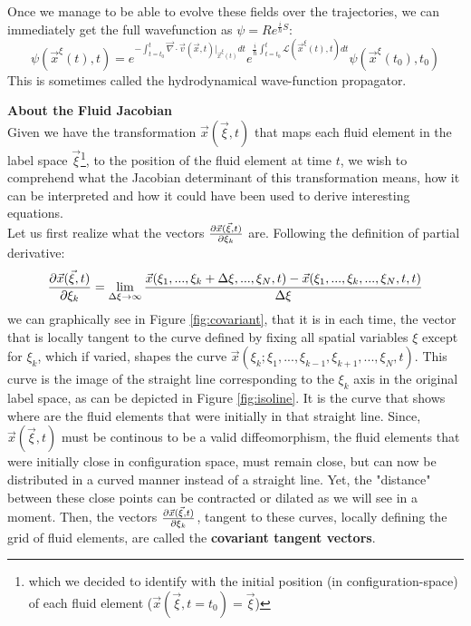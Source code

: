 \documentclass[11pt, a4paper]{article} %
\newcommand{\Lg}{\mathscr{L}}
\DeclareRobustCommand{\mybox}[2][gray!20]{%
\begin{tcolorbox}[   %
        left=1cm,
        right=1cm,
        top=0.5cm,
        bottom=0.5cm,
        colback=#1,
        colframe=#1,
        width=\dimexpr\textwidth\relax, 
        enlarge left by=0mm,
        boxsep=5pt,
        arc=0pt,outer arc=0pt,
        ]
        #2
\end{tcolorbox}
}
\begin{document}
Once we manage to be able to evolve these fields over the trajectories, we can immediately get the full wavefunction as $\psi=Re^{\frac{i}{\hbar}S}$:
\begin{equation}
\psi(\vec{x}^\xi(t),t)=e^{-\int_{t=t_0}^t \vec{\nabla}\cdot \vec{v}(\vec{x},t)\rvert_{\vec{x}^\xi(t)} dt}e^{\frac{i}{\hbar}\int_{t=t_0}^t \Lg(\vec{x}^\xi(t),t) dt}\psi(\vec{x}^\xi(t_0),t_0)
\end{equation}
This is sometimes called the hydrodynamical wave-function propagator.

\mybox{{\bf About the Fluid Jacobian\\ }
Given we have the transformation $\vec{x}(\vec{\xi},t)$ that maps each fluid element in the label space $\vec{\xi}$\footnote{which we decided to identify with the initial position (in configuration-space) of each fluid element ($\vec{x}(\vec{\xi},t=t_0)=\vec{\xi}$)}, to the position of the fluid element at time $t$, we wish to comprehend what the Jacobian determinant of this transformation means, how it can be interpreted and how it could have been used to derive interesting equations.\\

Let us first realize what the vectors $\pdv{\vec{x}(\vec{\xi},t)}{\xi_k}$ are. Following the definition of partial derivative:
\begin{equation}
\pdv{\vec{x}(\vec{\xi},t)}{\xi_k}=\lim_{\Delta \xi \rightarrow \infty} \frac{\vec{x}(\xi_1,...,\xi_k+\Delta \xi,...,\xi_N,t)-\vec{x}(\xi_1,...,\xi_k,...,\xi_N,t,t)}{\Delta \xi}
\end{equation}
we can graphically see in Figure \ref{fig:covariant}, that it is in each time, the vector that is locally tangent to the curve defined by fixing all spatial variables $\xi$ except for $\xi_k$, which if varied, shapes the curve $\vec{x}(\xi_k;\xi_1,...,\xi_{k-1},\xi_{k+1},...,\xi_N,t)$. This curve is the image of the straight line corresponding to the $\xi_k$ axis in the original label space, as can be depicted in Figure \ref{fig:isoline}. It is the curve that shows where are the fluid elements that were initially in that straight line. Since, $\vec{x}(\vec{\xi},t)$ must be continous to be a valid diffeomorphism, the fluid elements that were initially close in configuration space, must remain close, but can now be distributed in a curved manner instead of a straight line. Yet, the "distance" between these close points can be contracted or dilated as we will see in a moment. Then, the vectors $\pdv{\vec{x}(\vec{\xi},t)}{\xi_k}$, tangent to these curves, locally defining the grid of fluid elements, are called the {\bf covariant tangent vectors}.\\

}
\end{document}
